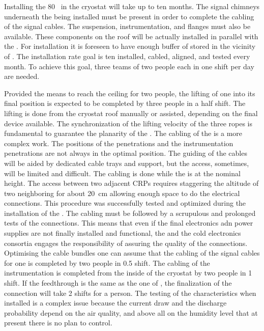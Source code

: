 Installing the 80~ in the cryostat will take up to ten months.
The signal chimneys underneath the  being installed must be present in order to complete the cabling of the signal cables.
The suspension, instrumentation, and  flanges must also be available.
These components on the roof will be actually installed in parallel with the .
For installation it is foreseen to have enough buffer of  stored in the vicinity of .
The installation rate goal is  ten  installed, cabled, aligned, %
and tested every month.
To achieve this goal, three teams of two people each in one shift per day are needed.

Provided the means to reach the ceiling for two people, the lifting of one  into its final position is expected to be completed by three people in a half shift. %
The lifting is done from the cryostat roof manually or assisted, depending on the final device available.
The synchronization of the lifting velocity of the three ropes is fundamental to guarantee the planarity of the .
The cabling of the  is a more complex work.
The positions of the  penetrations and the   instrumentation penetrations are not always in the optimal position.
The guiding of the cables will be aided by dedicated cable trays and support, but the access, sometimes, will be limited and difficult.
The cabling is done while the  is at the nominal height.
The access between two adjacent CRPs requires staggering the altitude of two neighboring  for about 20~cm allowing enough space to do the electrical connections.
This procedure was successfully tested and optimized during the installation of the .
The cabling must be followed by a scrupulous and prolonged tests of the connections.
This means that even if the final electronics adn power supplies are not finally installed and functional, the  and the cold electronics consortia engages the responsibility of assuring the quality of the connections. 
Optimising the cable bundles one can assume that the cabling of the signal cables for one  is completed by two people in 0.5 shift.
The cabling of the  instrumentation is completed from the inside of the cryostat by two people in 1 shift.
If the   feedthrough is the same as the one of , the finalization of the connection will take 2 shifts for a person.
The testing of the   characteristics when installed is a complex issue because the current draw and the discharge probability depend on the air quality, and above all on the humidity level that at present there is no plan to control.
